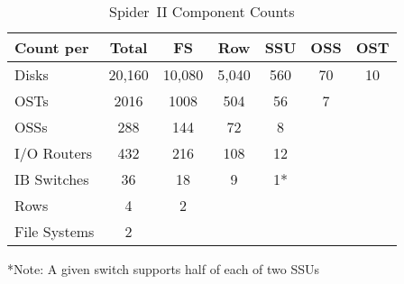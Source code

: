 \begin{table}
 \caption{Spider~II Component Counts}
 \label{table:component-counts}
 \begin{tabular}{ | l | c | c | c | c | c | c | }
  \hline
  Count per	& Total		& FS		& Row	& SSU	& OSS	& OST	\\ \hline
  Disks		& 20,160	& 10,080	& 5,040	& 560	& 70	& 10	\\ \hline
  OSTs		& 2016		& 1008		& 504	& 56	& 7	&	\\ \hline
  OSSs		& 288		& 144		& 72	& 8	&	&	\\ \hline
  I/O Routers	& 432		& 216		& 108	& 12	&	&	\\ \hline
  IB Switches	& 36		& 18		& 9	& 1*	&	&	\\ \hline
  Rows		& 4		& 2		&	&	&	&	\\ \hline
  File Systems	& 2		&		&	&	&	&	\\ \hline
 \end{tabular}
 *Note: A given switch supports half of each of two SSUs
\end{table}

